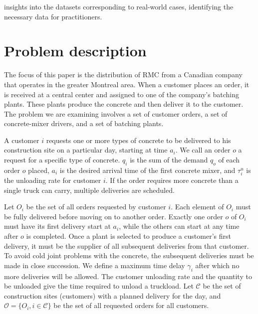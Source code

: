 \documentclass{article}
\begin{document}
insights into the datasets corresponding to real-world cases, identifying the necessary data for practitioners. 

\section{Problem description}
\label{desc_form}
The focus of this paper is the distribution of RMC from a Canadian company that operates in the greater Montreal area. When a customer places an order, it is received at a central center and assigned to one of the company's batching plants. These plants produce the concrete and then deliver it to the customer. The problem we are examining involves a set of customer orders, a set of concrete-mixer drivers, and a set of batching plants.


A customer $i$ requests one or more types of concrete to be delivered to his construction site on a particular day, starting at time $a_i$.  We call an order $o$ a request for a specific type of concrete.  $q_i$ is the sum of the demand $q_o$ of each order $o$ placed, $a_i$ is the desired arrival time of the first concrete mixer, and $\tau^u_i$ is the unloading rate for customer $i$. If the order requires more concrete than a single truck can carry, multiple deliveries are scheduled.

Let $O_i$ be the set of all orders requested by customer $i$. Each element of $O_i$ must be fully delivered before moving on to another order. Exactly one order $o$ of $O_i$ must have its first delivery start at $a_i$, while the others can start at any time after $o$ is completed. Once a plant is selected to produce a customer's first delivery, it must be the supplier of all subsequent deliveries from that customer. To avoid cold joint problems with the concrete, the subsequent deliveries must be made in close succession. We define a maximum time delay $\gamma_i$ after which no more deliveries will be allowed. The customer unloading rate and the quantity to be unloaded give the time required to unload a truckload. Let $\mathcal{C}$ be the set of construction sites (customers) with a planned delivery for the day, and $\mathcal{O}=\{{O_i, i \in \mathcal{C}}\}$ be the set of all requested orders for all customers. 

\end{document}
